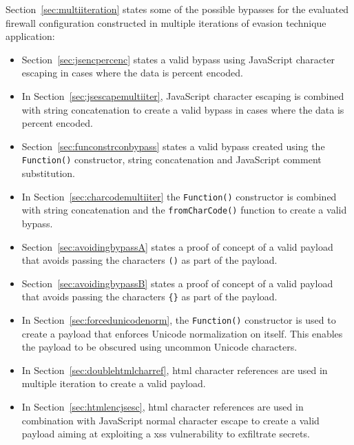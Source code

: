 Section~\ref{sec:multiiteration} states some of the possible bypasses for the evaluated firewall configuration constructed in multiple iterations of evasion technique application:
\begin{itemize}
	\item Section~\ref{sec:jsencpercenc} states a valid bypass using JavaScript character escaping in cases where the data is percent encoded.

	\item In Section~\ref{sec:jsescapemultiiter}, JavaScript character escaping is combined with string concatenation to create a valid bypass in cases where the data is percent encoded.

	\item Section~\ref{sec:funconstrconbypass} states a valid bypass created using the \verb|Function()| constructor, string concatenation and JavaScript comment substitution.

	\item In Section~\ref{sec:charcodemultiiter} the \verb|Function()| constructor is combined with string concatenation and the \verb|fromCharCode()| function to create a valid bypass.

	\item Section~\ref{sec:avoidingbypassA} states a proof of concept of a valid payload that avoids passing the characters \verb|()| as part of the payload.

	\item Section~\ref{sec:avoidingbypassB} states a proof of concept of a valid payload that avoids passing the characters \verb|{}| as part of the payload.

	\item In Section~\ref{sec:forcedunicodenorm}, the \verb|Function()| constructor is used to create a payload that enforces Unicode normalization on itself. This enables the payload to be obscured using uncommon Unicode characters.

	\item In Section~\ref{sec:doublehtmlcharref}, \acrshort{html} character references are used in multiple iteration to create a valid payload.

	\item In Section~\ref{sec:htmlencjsesc}, \acrshort{html} character references are used in combination with JavaScript normal character escape to create a valid payload aiming at exploiting a \acrshort{xss} vulnerability to exfiltrate secrets.
\end{itemize}

